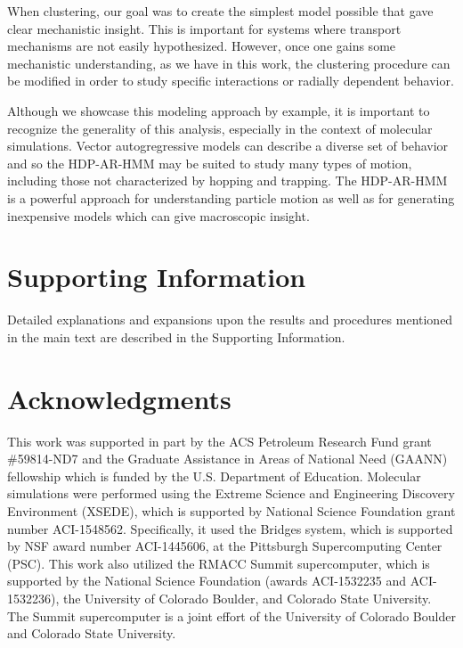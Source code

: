\documentclass[journal=jpcbfk,manuscript=article]{achemso}
\begin{document}
  When clustering, our goal was to create the simplest model possible that gave
  clear mechanistic insight. This is important for systems where transport mechanisms
  are not easily hypothesized. However, once one gains some mechanistic understanding,
  as we have in this work, the clustering procedure can be modified in order to 
  study specific interactions or radially dependent behavior.
  
  Although we showcase this modeling approach by example, it is important to
  recognize the generality of this analysis, especially in the context of molecular
  simulations. Vector autogregressive models can describe a diverse set of behavior
  and so the HDP-AR-HMM may be suited to study many types of motion, including those not 
  characterized by hopping and trapping. The HDP-AR-HMM is a powerful approach for 
  understanding particle motion as well as for generating inexpensive models
 which can give macroscopic insight.
  
  \section*{Supporting Information}

  Detailed explanations and expansions upon the results and procedures mentioned in
  the main text are described in the Supporting Information. 

  \section*{Acknowledgments}

  This work was supported in part by the ACS Petroleum Research Fund
  grant \#59814-ND7 and the Graduate Assistance in Areas of National Need (GAANN) 
  fellowship which is funded by the U.S. Department of Education. 
  Molecular simulations were performed using the Extreme Science and
  Engineering Discovery Environment (XSEDE), which is supported by National
  Science Foundation grant number ACI-1548562. Specifically, it used the Bridges
  system, which is supported by NSF award number ACI-1445606, at the Pittsburgh
  Supercomputing Center (PSC). This work also utilized the RMACC Summit supercomputer,
  which is supported by the National Science Foundation (awards ACI-1532235 and
  ACI-1532236), the University of Colorado Boulder, and Colorado State
  University. The Summit supercomputer is a joint effort of the University of
  Colorado Boulder and Colorado State University.

  \clearpage

  
  


\end{document}
